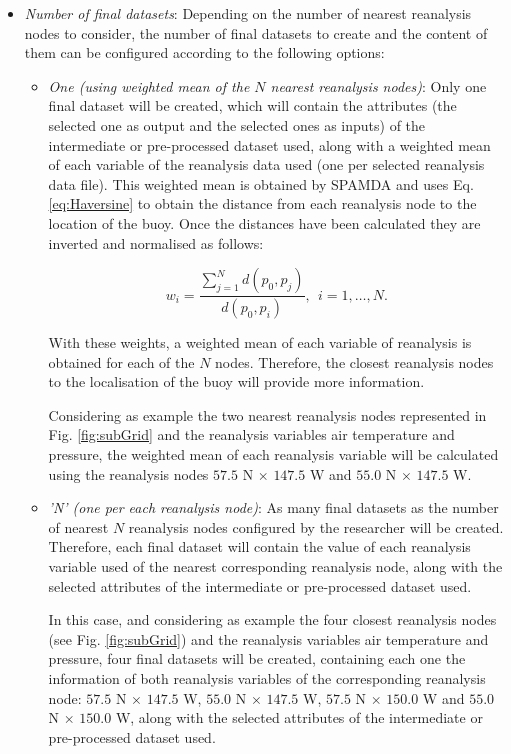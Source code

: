 \documentclass[review]{elsarticle}
\begin{document}
\begin{itemize}
					\item \textit{Number of final datasets}: Depending on the number of nearest reanalysis nodes to consider, the number of final datasets to create and the content of them can be configured according to the following options:
						\begin{itemize}
						
							\item \textit{One (using weighted mean of the $N$ nearest reanalysis nodes)}: Only one final dataset will be created, which will contain the attributes (the selected one as output and the selected ones as inputs) of the intermediate or pre-processed dataset used, along with a weighted mean of each variable of the reanalysis data used (one per selected reanalysis data file). This weighted mean is obtained by SPAMDA and uses Eq. \ref{eq:Haversine} to obtain the distance from each reanalysis node to the location of the buoy. Once the distances have been calculated they are inverted and normalised as follows:							
								\begin{linenomath*}
									\begin{equation}
										w_i=\frac{\sum_{j=1}^{N} d(p_0,p_j)}{d(p_0,p_i)}, ~~i=1, \ldots, N.
										\label{eq:weightedMean}
									\end{equation}
								\end{linenomath*}

							With these weights, a weighted mean of each variable of reanalysis is obtained for each of the $N$ nodes. Therefore, the closest reanalysis nodes to the localisation of the buoy will provide more information.
							
							Considering as example the two nearest reanalysis nodes represented in Fig. \ref{fig:subGrid} and the reanalysis variables air temperature and pressure, the weighted mean of each reanalysis variable will be calculated using the reanalysis nodes $57.5$ N $\times$ $147.5$ W and $55.0$ N $\times$ $147.5$ W.
							
							\item \textit{'N' (one per each reanalysis node)}: As many final datasets as the number of nearest $N$ reanalysis nodes configured by the researcher will be created. Therefore, each final dataset will contain the value of each reanalysis variable used of the nearest corresponding reanalysis node, along with the selected attributes of the intermediate or pre-processed dataset used.
							
							In this case, and considering as example the four closest reanalysis nodes (see Fig. \ref{fig:subGrid}) and the reanalysis variables air temperature and pressure, four final datasets will be created, containing each one the information of both reanalysis variables of the corresponding reanalysis node: $57.5$ N $\times$ $147.5$ W, $55.0$ N $\times$ $147.5$ W, $57.5$ N $\times$ $150.0$ W and $55.0$ N $\times$ $150.0$ W, along with the selected attributes of the intermediate or pre-processed dataset used.
							
						\end{itemize}
					
				\end{itemize}
						
\end{document}
